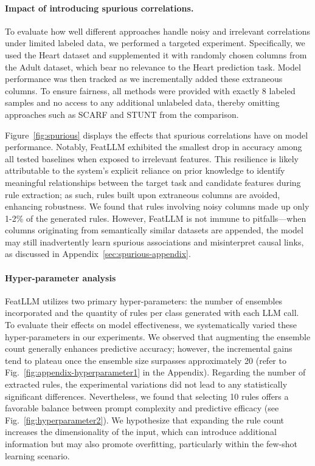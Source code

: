 \vspace*{-0.12in}
\paragraph{Impact of introducing spurious correlations.} To evaluate how well different approaches handle noisy and irrelevant correlations under limited labeled data, we performed a targeted experiment. Specifically, we used the Heart dataset and supplemented it with randomly chosen columns from the Adult dataset, which bear no relevance to the Heart prediction task. Model performance was then tracked as we incrementally added these extraneous columns. To ensure fairness, all methods were provided with exactly 8 labeled samples and no access to any additional unlabeled data, thereby omitting approaches such as SCARF and STUNT from the comparison.

Figure~\ref{fig:spurious} displays the effects that spurious correlations have on model performance. Notably, \textsf{FeatLLM} exhibited the smallest drop in accuracy among all tested baselines when exposed to irrelevant features. This resilience is likely attributable to the system's explicit reliance on prior knowledge to identify meaningful relationships between the target task and candidate features during rule extraction; as such, rules built upon extraneous columns are avoided, enhancing robustness. We found that rules involving noisy columns made up only 1-2\% of the generated rules. However, \textsf{FeatLLM} is not immune to pitfalls—when columns originating from semantically similar datasets are appended, the model may still inadvertently learn spurious associations and misinterpret causal links, as discussed in Appendix~\ref{sec:spurious-appendix}.

\vspace*{-0.12in}
\paragraph{Hyper-parameter analysis}
\textsf{FeatLLM} utilizes two primary hyper-parameters: the number of ensembles incorporated and the quantity of rules per class generated with each LLM call. To evaluate their effects on model effectiveness, we systematically varied these hyper-parameters in our experiments. We observed that augmenting the ensemble count generally enhances predictive accuracy; however, the incremental gains tend to plateau once the ensemble size surpasses approximately 20 (refer to Fig.~\ref{fig:appendix-hyperparameter1} in the Appendix). Regarding the number of extracted rules, the experimental variations did not lead to any statistically significant differences. Nevertheless, we found that selecting 10 rules offers a favorable balance between prompt complexity and predictive efficacy (see Fig.~\ref{fig:hyperparameter2}). We hypothesize that expanding the rule count increases the dimensionality of the input, which can introduce additional information but may also promote overfitting, particularly within the few-shot learning scenario.

